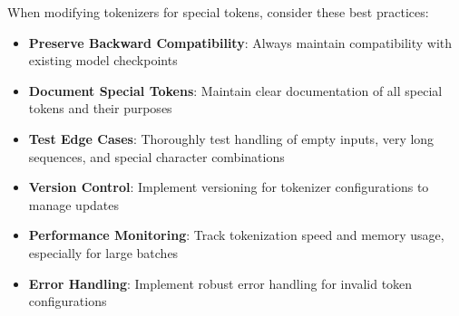 When modifying tokenizers for special tokens, consider these best practices:

\begin{itemize}
\item \textbf{Preserve Backward Compatibility}: Always maintain compatibility with existing model checkpoints
\item \textbf{Document Special Tokens}: Maintain clear documentation of all special tokens and their purposes
\item \textbf{Test Edge Cases}: Thoroughly test handling of empty inputs, very long sequences, and special character combinations
\item \textbf{Version Control}: Implement versioning for tokenizer configurations to manage updates
\item \textbf{Performance Monitoring}: Track tokenization speed and memory usage, especially for large batches
\item \textbf{Error Handling}: Implement robust error handling for invalid token configurations
\end{itemize}
\begin{comment}
Feedback: This is a good list. To make it more actionable:
1.  **Preserve Backward Compatibility**: "When adding new special tokens, save the new tokenizer configuration to a *new* directory. Do not overwrite the original. This allows you to load both the old and new versions of the model and tokenizer, which is crucial for testing and deployment."
2.  **Version Control**: "Store your `special_tokens_map.json` and `tokenizer_config.json` files in your version control system (like Git) alongside your model code. This ensures that changes to the tokenizer are tracked and reproducible."
3.  **Test Edge Cases**: "Create a small suite of unit tests for your tokenizer that includes tricky cases: strings that look like your special tokens, empty strings, strings with mixed special and normal tokens, etc. This can prevent many common bugs."
\end{comment}


